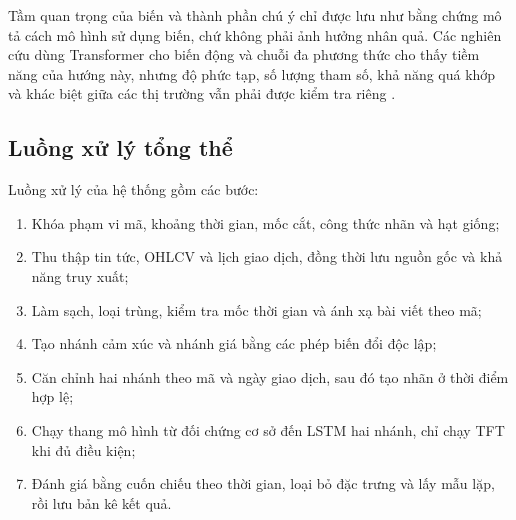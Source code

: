 Tầm quan trọng của biến và thành phần chú ý chỉ được lưu như bằng chứng mô tả cách mô
hình sử dụng biến, chứ không phải ảnh hưởng nhân quả. Các nghiên cứu dùng Transformer
cho biến động và chuỗi đa phương thức cho thấy tiềm năng của hướng này, nhưng độ phức
tạp, số lượng tham số, khả năng quá khớp và khác biệt giữa các thị trường vẫn phải được
kiểm tra riêng \cite{Boyle2023_230503835v1,Omranpour2024_241210540v1}.

\subsection{Luồng xử lý tổng thể}

Luồng xử lý của hệ thống gồm các bước:

\begin{enumerate}[nosep]
  \item Khóa phạm vi mã, khoảng thời gian, mốc cắt, công thức nhãn và hạt giống;
  \item Thu thập tin tức, OHLCV và lịch giao dịch, đồng thời lưu nguồn gốc và khả năng truy xuất;
  \item Làm sạch, loại trùng, kiểm tra mốc thời gian và ánh xạ bài viết theo mã;
  \item Tạo nhánh cảm xúc và nhánh giá bằng các phép biến đổi độc lập;
  \item Căn chỉnh hai nhánh theo mã và ngày giao dịch, sau đó tạo nhãn ở thời điểm hợp lệ;
  \item Chạy thang mô hình từ đối chứng cơ sở đến LSTM hai nhánh, chỉ chạy TFT khi đủ điều kiện;
  \item Đánh giá bằng cuốn chiếu theo thời gian, loại bỏ đặc trưng và lấy mẫu lặp, rồi lưu bản kê kết quả.
\end{enumerate}

